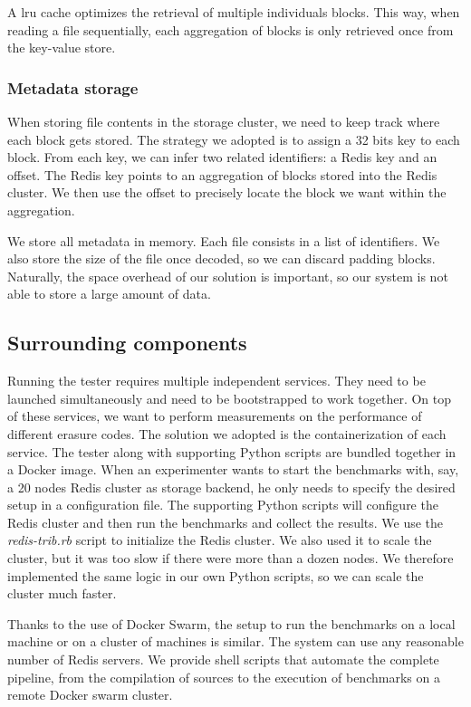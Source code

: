 A \ac{lru} cache optimizes the retrieval of multiple individuals blocks.
This way, when reading a file sequentially, each aggregation of blocks is only retrieved once from the key-value store.

\subsubsection{Metadata storage}

When storing file contents in the storage cluster, we need to keep track where each block gets stored.
The strategy we adopted is to assign a 32 bits key to each block.
From each key, we can infer two related identifiers: a Redis key and an offset.
The Redis key points to an aggregation of blocks stored into the Redis cluster.
We then use the offset to precisely locate the block we want within the aggregation.

We store all metadata in memory.
Each file consists in a list of identifiers.
We also store the size of the file once decoded, so we can discard padding blocks.
Naturally, the space overhead of our solution is important, so our system is not able to store a large amount of data.

\subsection{Surrounding components}

Running the tester requires multiple independent services.
They need to be launched simultaneously and need to be bootstrapped to work together.
On top of these services, we want to perform measurements on the performance of different erasure codes.
The solution we adopted is the containerization of each service.
The tester along with supporting Python scripts are bundled together in a Docker image.
When an experimenter wants to start the benchmarks with, say, a 20 nodes Redis cluster as storage backend, he only needs to specify the desired setup in a configuration file.
The supporting Python scripts will configure the Redis cluster and then run the benchmarks and collect the results.
We use the \textit{redis-trib.rb} script to initialize the Redis cluster.
We also used it to scale the cluster, but it was too slow if there were more than a dozen nodes.
We therefore implemented the same logic in our own Python scripts, so we can scale the cluster much faster.

Thanks to the use of Docker Swarm, the setup to run the benchmarks on a local machine or on a cluster of machines is similar.
The system can use any reasonable number of Redis servers.
We provide shell scripts that automate the complete pipeline, from the compilation of sources to the execution of benchmarks on a remote Docker swarm cluster.

